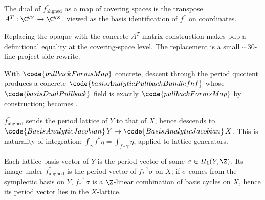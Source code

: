 \begin{lemma}[Pass pdp.2: dual map = transposed matrix]
\label{lem:pdp-r2}
The dual of $f^{*}_{\mathrm{aligned}}$ as a map of covering spaces is
the transpose $A^{T}:\C^{g_{Y}}\to\C^{g_{X}}$, viewed as the basis
identification of $f^{*}$ on coordinates.
\leanok
\end{lemma}

\begin{lemma}
\label{lem:pdp-r3}
Replacing the opaque  with the concrete
$A^{T}$-matrix construction makes pdp a definitional equality at the
covering-space level. The replacement is a small $\sim$30-line
project-side rewrite.
\leanok
\end{lemma}

\begin{lemma}
\label{lem:pdp-r4}
With $\code{pullbackFormsMap}$ concrete, descent through the period
quotient produces a concrete
$\code{basisAnalyticPullbackBundle f hf}$ whose
$\code{basisDualPullback}$ field is exactly $\code{pullbackFormsMap}$
by construction;  becomes .
\leanok
\end{lemma}

\begin{lemma}
\label{lem:pdp-r5}
$f^{*}_{\mathrm{aligned}}$ sends the period lattice of $Y$ to that of
$X$, hence descends to
$\code{BasisAnalyticJacobian}\,Y\to\code{BasisAnalyticJacobian}\,X$.
This is naturality of integration:
$\int_{\gamma}f^{*}\eta=\int_{f\circ\gamma}\eta$, applied to lattice
generators.
\leanok
\end{lemma}

\begin{lemma}
\label{lem:pdp-r6}
Each lattice basis vector of $Y$ is the period vector of some
$\sigma\in H_{1}(Y,\Z)$.  Its image under $f^{*}_{\mathrm{aligned}}$
is the period vector of $f_{*}^{-1}\sigma$ on $X$; if $\sigma$ comes
from the symplectic basis on $Y$, $f_{*}^{-1}\sigma$ is a $\Z$-linear
combination of basis cycles on $X$, hence its period vector lies in
the $X$-lattice.
\leanok
\end{lemma}

